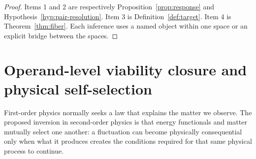 \documentclass[11pt]{article}
\newcommand{\Pspace}{\ensuremath{\mathcal P}}
\newcommand{\ARspace}{\ensuremath{\mathcal A_R}}
\newcommand{\Bridge}{\ensuremath{\mathfrak B}}
\newcommand{\Status}{\ensuremath{\mathsf{Status}}}
\newcommand{\Defn}{\textsc{[def]}}
\newcommand{\Hyp}{\textsc{[hyp]}}
\newcommand{\Thm}{\textsc{[thm]}}
\newcommand{\Cnd}{\textsc{[cnd]}}
\theoremstyle{definition}
\begin{document}
\begin{proof}
Items 1 and 2 are respectively Proposition~\ref{prop:response} and
Hypothesis~\ref{hyp:pair-resolution}.  Item 3 is Definition~\ref{def:target}.
Item 4 is Theorem~\ref{thm:fiber}.  Each inference uses a named object within
one space or an explicit bridge between the spaces.
\end{proof}




%

\section{Operand-level viability closure and physical self-selection}
\label{sec:operand-self-selection-v5}

First-order physics normally seeks a law that explains the matter we observe.
The proposed inversion in second-order physics is that energy functionals and
matter mutually select one another: a fluctuation can become physically
consequential only when what it produces creates the conditions required for
that same physical process to continue.
\end{document}
